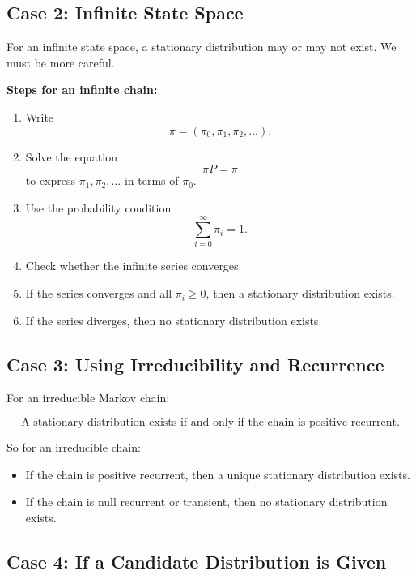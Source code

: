 \documentclass[12pt,a4paper]{article}
\theoremstyle{notestyle}
\begin{document}
\subsection*{Case 2: Infinite State Space}

For an infinite state space, a stationary distribution may or may not exist. We must be more careful.

\textbf{Steps for an infinite chain:}

\begin{enumerate}[leftmargin=1.2cm]
    \item Write
    \[
    \pi=(\pi_0,\pi_1,\pi_2,\ldots).
    \]
    \item Solve the equation
    \[
    \pi P=\pi
    \]
    to express $\pi_1,\pi_2,\ldots$ in terms of $\pi_0$.
    \item Use the probability condition
    \[
    \sum_{i=0}^{\infty}\pi_i=1.
    \]
    \item Check whether the infinite series converges.
    \item If the series converges and all $\pi_i\geq 0$, then a stationary distribution exists.
    \item If the series diverges, then no stationary distribution exists.
\end{enumerate}

\subsection*{Case 3: Using Irreducibility and Recurrence}

For an irreducible Markov chain:

\[
\boxed{
\text{A stationary distribution exists if and only if the chain is positive recurrent.}
}
\]

So for an irreducible chain:

\begin{itemize}[leftmargin=1.2cm]
    \item If the chain is positive recurrent, then a unique stationary distribution exists.
    \item If the chain is null recurrent or transient, then no stationary distribution exists.
\end{itemize}

\subsection*{Case 4: If a Candidate Distribution is Given}
\end{document}
